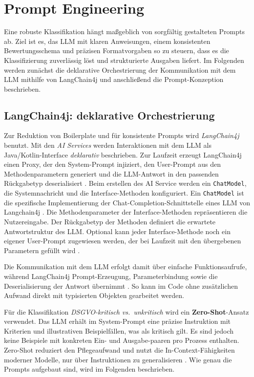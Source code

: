 \section{Prompt Engineering}\label{sec:prompt-engineering}

Eine robuste Klassifikation hängt maßgeblich von sorgfältig gestalteten Prompts ab. Ziel ist es, das \ac{LLM} mit klaren Anweisungen, einem konsistenten Bewertungsschema und präzisen Formatvorgaben so zu steuern, dass es die Klassifizierung zuverlässig löst und strukturierte Ausgaben liefert. Im Folgenden werden zunächst die deklarative Orchestrierung der Kommunikation mit dem \ac{LLM} mithilfe von LangChain4j und anschließend die Prompt-Konzeption beschrieben.

\subsection*{LangChain4j: deklarative Orchestrierung}
Zur Reduktion von Boilerplate und für konsistente Prompts wird \emph{LangChain4j} \cite{langchain4j} benutzt. Mit den \emph{AI Services} werden Interaktionen mit dem \ac{LLM} als Java/Kotlin-Interface \emph{deklarativ} beschrieben. Zur Laufzeit erzeugt LangChain4j einen Proxy, der den System-Prompt injiziert, den User-Prompt aus den Methodenparametern generiert und die \ac{LLM}-Antwort in den passenden Rückgabetyp deserialisiert \cite{langchain4j-ai-services}. Beim erstellen des AI Service werden ein \texttt{ChatModel}, die Systemnachricht und die Interface-Methoden konfiguriert. Ein \texttt{ChatModel} ist die spezifische Implementierung der Chat-Completion-Schnittstelle eines \ac{LLM} von Langchain4j \cite{langchain4j-chat-model}. Die Methodenparameter der Interface-Methoden repräsentieren die Nutzereingabe. Der Rückgabetyp der Methoden definiert die erwartete Antwortstruktur des \ac{LLM}. Optional kann jeder Interface-Methode noch ein eigener User-Prompt zugewiesen werden, der bei Laufzeit mit den übergebenen Parametern gefüllt wird \cite{langchain4j-ai-services}.

Die Kommunikation mit dem \ac{LLM} erfolgt damit über einfache Funktionsaufrufe, während LangChain4j Prompt-Erzeugung, Parameterbindung sowie die Deserialisierung der Antwort übernimmt \cite{langchain4j-ai-services}. So kann im Code ohne zusätzlichen Aufwand direkt mit typisierten Objekten gearbeitet werden.

Für die Klassifikation \emph{\ac{DSGVO}-kritisch vs.\ unkritisch} wird ein \textbf{Zero-Shot}-Ansatz verwendet. Das \ac{LLM} erhält im System-Prompt eine präzise Instruktion mit Kriterien und illustrativen Beispielfällen, was als kritisch gilt. Es sind jedoch keine Beispiele mit konkreten Ein- und Ausgabe-paaren pro Prozess enthalten. Zero-Shot reduziert den Pflegeaufwand und nutzt die In-Context-Fähigkeiten moderner Modelle, nur über Instruktionen zu generalisieren \cite{brown2020fewshot,liu2023prompting}. Wie genau die Prompts aufgebaut sind, wird im Folgenden beschrieben.

